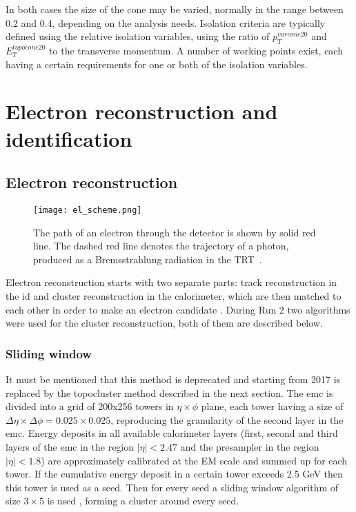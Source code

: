      In both cases the size of the cone may be varied, normally in the range between 0.2 and 0.4, depending on the analysis needs. Isolation criteria are typically defined using the relative isolation variables, using the ratio of  $p_T^{varcone20}$ and $E_T^{topocone20}$ to the transverse momentum. A number of working points exist, each having a certain requirements for one or both of the isolation variables.
     
     \section{Electron reconstruction and identification}
     \subsection{Electron reconstruction}
           \begin{figure}[htbp]
     	\centering
     	\texttt{[image: el\_scheme.png]}
     	\caption[Electron path]{The path of an electron through the detector is shown by solid red line. The dashed red line denotes the trajectory of a photon, produced as a Bremsstrahlung radiation in the TRT~\cite{electrons_reco1}.}
     	\label{fig::el_id_scheme}
     \end{figure}
     Electron reconstruction starts with two separate parts: track reconstruction in the \gls{id} and cluster reconstruction in the calorimeter, which are then matched to each other in order to make an electron candidate \cite{electrons_reco1}. During Run 2 two algorithms were used for the cluster reconstruction, both of them are described below.
     
     \subsubsection{Sliding window}
     It must be mentioned that this method is deprecated and starting from 2017 is replaced by the topocluster method described in the next section. 
     The \gls{emc} is divided into a grid of 200x256 towers in $\eta \times \phi$ plane, each tower having a size of $\Delta \eta \times \Delta \phi=0.025\times0.025$, reproducing the granularity of the second layer in the \gls{emc}. Energy deposits in all available calorimeter layers (first, second and third layers of the \gls{emc} in the region $|\eta| < 2.47$ and the presampler in the region $|\eta| < 1.8$) are approximately calibrated at the EM scale and summed up for each tower. If the cumulative energy deposit in a certain tower exceeds 2.5 GeV then this tower is used as a seed. Then for every seed a sliding window algorithm of size $3 \times 5$ is used \cite{Lampl:1099735}, forming a cluster around every seed. 
     
